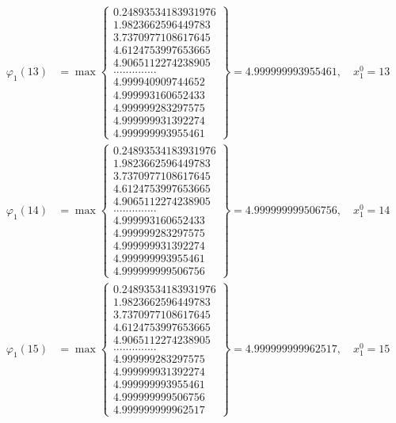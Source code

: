 \documentclass{article}
\begin{document}
\begin{align*}
  
  
  
\varphi_{1}(13) &= \max \left\{ \begin{array}{c}
0.24893534183931976 \\
 1.9823662596449783 \\
 3.7370977108617645 \\
 4.6124753997653665 \\
 4.9065112274238905 \\
 .............. \\
 4.999940909744652 \\
 4.999993160652433 \\
 4.999999283297575 \\
 4.999999931392274 \\
 4.999999993955461
\end{array} \right\} = 4.999999993955461, \quad x_{1}^0 = 13\\
  
  
  
  
\varphi_{1}(14) &= \max \left\{ \begin{array}{c}
0.24893534183931976 \\
 1.9823662596449783 \\
 3.7370977108617645 \\
 4.6124753997653665 \\
 4.9065112274238905 \\
 .............. \\
 4.999993160652433 \\
 4.999999283297575 \\
 4.999999931392274 \\
 4.999999993955461 \\
 4.999999999506756
\end{array} \right\} = 4.999999999506756, \quad x_{1}^0 = 14\\
  
  
  
  
\varphi_{1}(15) &= \max \left\{ \begin{array}{c}
0.24893534183931976 \\
 1.9823662596449783 \\
 3.7370977108617645 \\
 4.6124753997653665 \\
 4.9065112274238905 \\
 .............. \\
 4.999999283297575 \\
 4.999999931392274 \\
 4.999999993955461 \\
 4.999999999506756 \\
 4.999999999962517
\end{array} \right\} = 4.999999999962517, \quad x_{1}^0 = 15\\
  

\end{align*}
\end{document}
